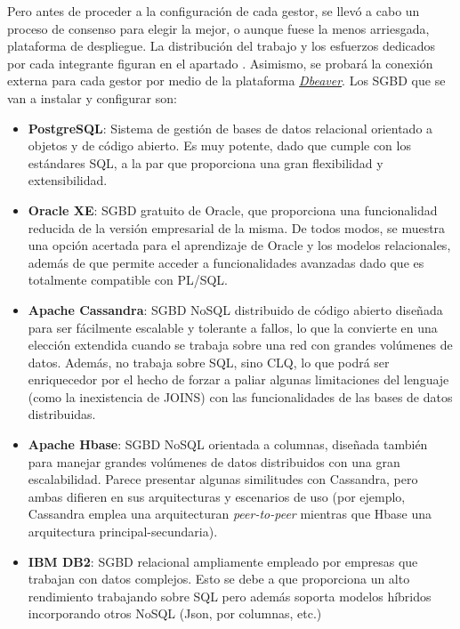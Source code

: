\documentclass{article}
\begin{document}
Pero antes de proceder a la configuración de cada gestor, se llevó a cabo un proceso de consenso para elegir la mejor, o aunque fuese la menos arriesgada, plataforma de despliegue. La distribución del trabajo y los esfuerzos dedicados por cada integrante figuran en el apartado \textcolor{blue}{}. Asimismo, se probará la conexión externa para cada gestor por medio de la plataforma \textit{\textcolor{blue}{\href{https://dbeaver.com/download/enterprise/}{Dbeaver}}}.
\newline
Los SGBD que se van a instalar y configurar son:
\begin{itemize}
    \item \textbf{PostgreSQL}: Sistema de gestión de bases de datos relacional orientado a objetos y de código abierto. Es muy potente, dado que cumple con los estándares SQL, a la par que proporciona una gran flexibilidad y extensibilidad.
    \item \textbf{Oracle XE}: SGBD gratuito de Oracle, que proporciona una funcionalidad reducida de la versión empresarial de la misma. De todos modos, se muestra una opción acertada para el aprendizaje de Oracle y los modelos relacionales, además de que permite acceder a funcionalidades avanzadas dado que es totalmente compatible con PL/SQL.
    \item \textbf{Apache Cassandra}: SGBD NoSQL distribuido de código abierto diseñada para ser fácilmente escalable y tolerante a fallos, lo que la convierte en una elección extendida cuando se trabaja sobre una red con grandes volúmenes de datos. Además, no trabaja sobre SQL, sino CLQ, lo que podrá ser enriquecedor por el hecho de forzar a paliar algunas limitaciones del lenguaje (como la inexistencia de JOINS) con las funcionalidades de las bases de datos distribuidas.
    \item \textbf{Apache Hbase}: SGBD NoSQL orientada a columnas, diseñada también para manejar grandes volúmenes de datos distribuidos con una gran escalabilidad. Parece presentar algunas similitudes con Cassandra, pero ambas difieren en sus arquitecturas y escenarios de uso (por ejemplo, Cassandra emplea una arquitecturan \textit{peer-to-peer} mientras que Hbase una arquitectura principal-secundaria).
    \item \textbf{IBM DB2}: SGBD relacional ampliamente empleado por empresas que trabajan con datos complejos. Esto se debe a que proporciona un alto rendimiento trabajando sobre SQL pero además soporta modelos híbridos incorporando otros NoSQL (Json, por columnas, etc.)
\end{itemize}
\end{document}
